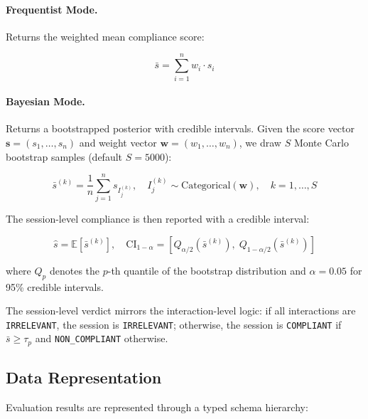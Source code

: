 \documentclass[11pt]{article}
\begin{document}
\paragraph{Frequentist Mode.} Returns the weighted mean compliance score:

\begin{equation}
    \bar{s} = \sum_{i=1}^{n} w_i \cdot s_i
\end{equation}

\paragraph{Bayesian Mode.} Returns a bootstrapped posterior with credible intervals. Given the score vector $\mathbf{s} = (s_1, \ldots, s_n)$ and weight vector $\mathbf{w} = (w_1, \ldots, w_n)$, we draw $S$ Monte Carlo bootstrap samples (default $S = 5000$):

\begin{equation}
    \bar{s}^{(k)} = \frac{1}{n} \sum_{j=1}^{n} s_{I_j^{(k)}}, \quad I_j^{(k)} \sim \text{Categorical}(\mathbf{w}), \quad k = 1, \ldots, S
\end{equation}

The session-level compliance is then reported with a credible interval:

\begin{equation}
    \hat{s} = \mathbb{E}[\bar{s}^{(k)}], \quad \text{CI}_{1-\alpha} = \left[ Q_{\alpha/2}(\bar{s}^{(k)}), \; Q_{1-\alpha/2}(\bar{s}^{(k)}) \right]
\end{equation}

where $Q_p$ denotes the $p$-th quantile of the bootstrap distribution and $\alpha = 0.05$ for 95\% credible intervals.

The session-level verdict mirrors the interaction-level logic: if all interactions are \texttt{IRRELEVANT}, the session is \texttt{IRRELEVANT}; otherwise, the session is \texttt{COMPLIANT} if $\bar{s} \geq \tau_p$ and \texttt{NON\_COMPLIANT} otherwise.

\subsection{Data Representation}

Evaluation results are represented through a typed schema hierarchy:
\end{document}
